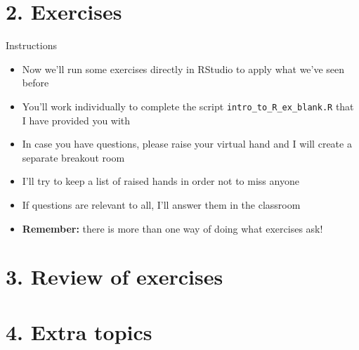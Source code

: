 \documentclass[xcolor=table,dvipsnames]{beamer}
\begin{document}
\section{2. Exercises}

\begin{frame}{Instructions}
\begin{itemize}
\item Now we'll run some exercises directly in RStudio to apply what we've seen before \pause
\item You'll work individually to complete the script \texttt{intro\_to\_R\_ex\_blank.R} that I have provided you with \pause
\item In case you have questions, please raise your virtual hand and I will create a separate breakout room \pause
\item I'll try to keep a list of raised hands in order not to miss anyone \pause
\item If questions are relevant to all, I'll answer them in the classroom \pause
\item \textbf{Remember:} there is more than one way of doing what exercises ask!
\end{itemize}
\end{frame}

\section{3. Review of exercises}

\section{4. Extra topics}
\end{document}
